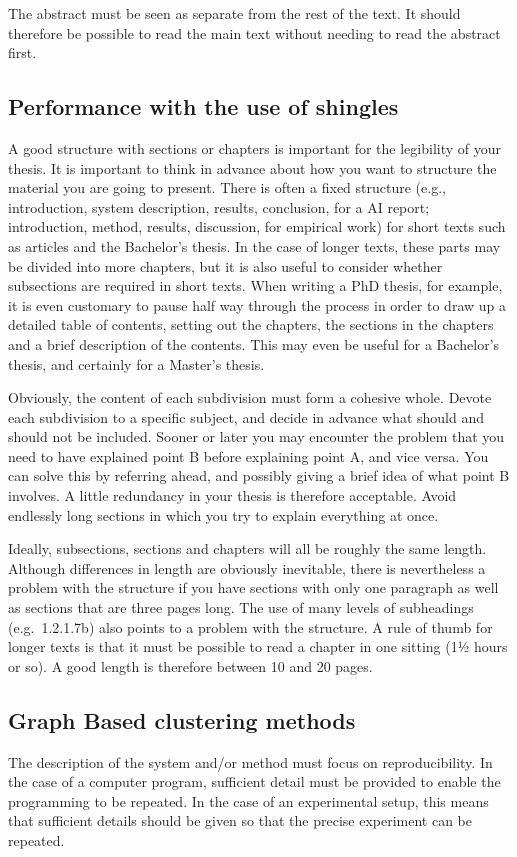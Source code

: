The abstract must be seen as separate from the rest of the text.
It should therefore be possible to read the main text without needing to read the abstract first.

\subsection{Performance with the use of shingles}\label{sec:_subdivide_text}
A good structure with sections or chapters is important for the legibility of your thesis.
It is important to think in advance about how you want to structure the material you are going to present.
There is often a fixed structure (e.g., introduction, system description, results, conclusion, for a AI report; introduction, method, results, discussion, for empirical work) for short texts such as articles and the Bachelor's thesis.
In the case of longer texts, these parts may be divided into more chapters, but it is also useful to consider whether subsections are required in short texts.
When writing a PhD thesis, for example, it is even customary to pause half way through the process in order to draw up a detailed table of contents, setting out the chapters, the sections in the chapters and a brief description of the contents.
This may even be useful for a Bachelor's thesis, and certainly for a Master's thesis.

Obviously, the content of each subdivision must form a cohesive whole.
Devote each subdivision to a specific subject, and decide in advance what should and should not be included.
Sooner or later you may encounter the problem that you need to have explained point B before explaining point A, and vice versa.
You can solve this by referring ahead, and possibly giving a brief idea of what point B involves.
A little redundancy in your thesis is therefore acceptable.
Avoid endlessly long sections in which you try to explain everything at once.

Ideally, subsections, sections and chapters will all be roughly the same length.
Although differences in length are obviously inevitable, there is nevertheless a problem with the structure if you have sections with only one paragraph as well as sections that are three pages long.
The use of many levels of  subheadings (e.g.\ 1.2.1.7b) also points to a problem with the structure.
A rule of thumb for longer texts is that it must be possible to read a chapter in one sitting (1½ hours or so).
A good length is therefore between 10 and 20 pages.


\subsection{Graph Based clustering methods}\label{sec:_system_methods}
The description of the system and/or method must focus on reproducibility.
In the case of a computer program, sufficient detail must be provided to enable the programming to be repeated.
In the case of an experimental setup, this means that sufficient details should be given so that the precise experiment can be repeated.

